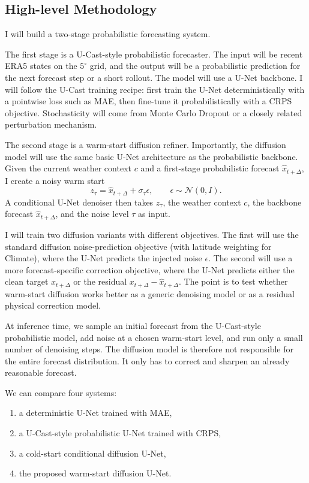 \documentclass{article}
\begin{document}
\subsection{High-level Methodology}

I will build a two-stage probabilistic forecasting system.

The first stage is a U-Cast-style probabilistic forecaster. The input will be recent ERA5 states on the $5^\circ$ grid, and the output will be a probabilistic prediction for the next forecast step or a short rollout. The model will use a U-Net backbone. I will follow the U-Cast training recipe: first train the U-Net deterministically with a pointwise loss such as MAE, then fine-tune it probabilistically with a CRPS objective. Stochasticity will come from Monte Carlo Dropout or a closely related perturbation mechanism.

The second stage is a warm-start diffusion refiner. Importantly, the diffusion model will use the same basic U-Net architecture as the probabilistic backbone. Given the current weather context $c$ and a first-stage probabilistic forecast $\hat{x}_{t+\Delta}$, I create a noisy warm start
\[
z_\tau = \hat{x}_{t+\Delta} + \sigma_\tau \epsilon,
\qquad \epsilon \sim \mathcal{N}(0, I).
\]
A conditional U-Net denoiser then takes $z_\tau$, the weather context $c$, the backbone forecast $\hat{x}_{t+\Delta}$, and the noise level $\tau$ as input.

I will train two diffusion variants with different objectives. The first will use the standard diffusion noise-prediction objective (with latitude weighting for Climate), where the U-Net predicts the injected noise $\epsilon$. The second will use a more forecast-specific correction objective, where the U-Net predicts either the clean target $x_{t+\Delta}$ or the residual $x_{t+\Delta} - \hat{x}_{t+\Delta}$. The point is to test whether warm-start diffusion works better as a generic denoising model or as a residual physical correction model.

At inference time, we sample an initial forecast from the U-Cast-style probabilistic model, add noise at a chosen warm-start level, and run only a small number of denoising steps. The diffusion model is therefore not responsible for the entire forecast distribution. It only has to correct and sharpen an already reasonable forecast.

We can compare four systems:
\begin{enumerate}
    \item a deterministic U-Net trained with MAE,
    \item a U-Cast-style probabilistic U-Net trained with CRPS,
    \item a cold-start conditional diffusion U-Net,
    \item the proposed warm-start diffusion U-Net.
\end{enumerate}
\end{document}
